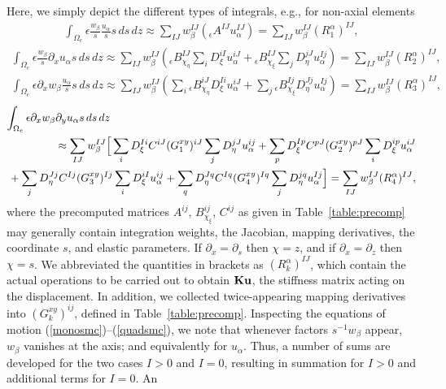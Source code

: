 \documentclass[11pt,letter,fleqn,english,notitlepage]{article}
\newcommand{\eqa}{\begin{eqnarray}} \newcommand{\ena}{\end{eqnarray}}
\newcommand{\bu}{\mbox{${\bf u}$}} \newcommand{\bv}{\mbox{${\bf v}$}}
\newcommand{\bK}{\mbox{${\bf K}$}} \newcommand{\bS}{\mbox{${\bf S}$}}
\begin{document}
Here, we simply depict the different types of integrals, 
e.g., for non-axial elements
%
\eqa \label{eq:scheme_wu}
\int_{\Omega_e} \epsilon \frac{w_\beta}{s} \frac{u_\alpha}{s}s\,ds\,dz \approx 
\sum_{IJ}w_\beta^{IJ} \left({_\epsilon}A^{IJ}u^{IJ}_\alpha\right)=
\sum_{IJ}w_\beta^{IJ} (R^\alpha_1)^{IJ},
\ena
%
\eqa \label{eq:scheme_wdu}
\int_{\Omega_e} \epsilon \frac{w_\beta}{s} \partial_x u_\alpha
s\,ds\,dz \approx 
\sum_{IJ}w_\beta^{IJ}
\left({}_\epsilon{B}_{\chi_\eta}^{IJ}\sum_iD_\xi^{iI}u^{iJ}_\alpha
+{}_\epsilon{B}_{\chi_\xi}^{IJ}\sum_jD_\eta^{jJ}u^{Ij}_\alpha\right)=
\sum_{IJ}w_\beta^{IJ} (R^\alpha_2)^{IJ},
\ena
%
\eqa \label{eq:scheme_dwu}
\int_{\Omega_e}\epsilon \partial_x w_\beta \frac{u_\alpha}{s}s\,ds\,dz \approx 
\sum_{IJ}w_\beta^{IJ}
\left(\sum_i {}_\epsilon{B}_{\chi_\eta}^{iJ}D_\xi^{Ii}u^{iJ}_\alpha+
\sum_j {}_\epsilon{B}_{\chi_\xi}^{Ij}D_\eta^{Jj}u^{Ij}_\alpha\right)=
\sum_{IJ}w_\beta^{IJ} (R^\alpha_3)^{IJ},
\ena
%
\eqa \label{eq:scheme_dwdu}
\lefteqn{\int_{\Omega_e}
\epsilon \partial_x w_\beta \partial_y u_\alpha s\,ds\,dz 
}  \nonumber \\
&&\mbox{}\hspace{-0.9em}
\approx\sum_{IJ}w_\beta^{IJ}\Big[
\sum_i D_\xi^{Ii} C^{iJ}(G_{1}^{xy})^{iJ} \sum_j D_\eta^{jJ}u^{ij}_\alpha+
\sum_p D_\xi^{Ip} C^{pJ}(G_{2}^{xy})^{pJ} \sum_i D_\xi^{ip}u^{iJ}_\alpha 
\nonumber\\
&&\mbox{}\hspace{-0.9em}
+\sum_j D_\eta^{Jj} C^{Ij}(G_{3}^{xy})^{Ij}\sum_i D_\xi^{iI}u^{ij}_\alpha+
\sum_q D_\eta^{Jq} C^{Iq}(G_{4}^{xy})^{Iq}\sum_j D_\eta^{jq}u^{Ij}_\alpha\Big]=
\sum_{IJ}w_\beta^{IJ} (R^\alpha_4)^{IJ},
\ena
%
where the precomputed matrices $A^{ij}$, $B_{\chi_\xi}^{ij}$, $C^{ij}$ as 
given in Table~\ref{table:precomp} may generally contain integration weights, 
the Jacobian, mapping derivatives, the coordinate $s$, and elastic parameters. 
If $\partial_x=\partial_s$ then $\chi=z$, and if $\partial_x=\partial_z$ then 
$\chi=s$. We abbreviated the quantities in brackets as 
$(R^\alpha_k)^{IJ}$, which contain the actual operations to be carried out 
to obtain $\bK\bu$, the stiffness matrix acting on the displacement.
In addition, we collected twice-appearing mapping derivatives into 
$(G_k^{xy})^{ij}$, defined in Table~\ref{table:precomp}.
%
Inspecting the equations of motion (\ref{monosmc})--(\ref{quadsmc}), 
we note that whenever factors $s^{-1} w_\beta$ appear, 
$w_\beta$ vanishes at the axis; and equivalently for $u_\alpha$. Thus, 
a number of sums are developed for the two cases $I>0$ and $I=0$, 
resulting in summation for $I>0$ and additional terms for $I=0$. An 
\end{document}
